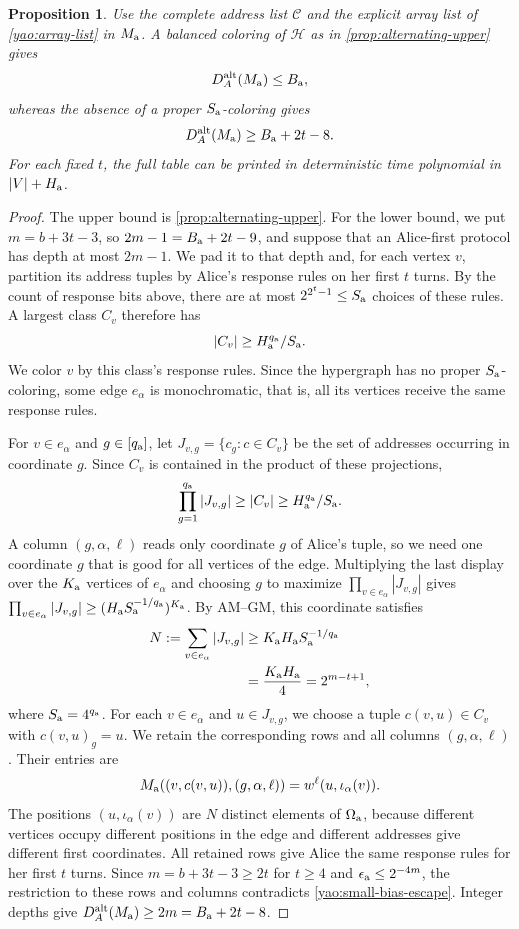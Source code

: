 \documentclass[11pt,letterpaper]{article} \usepackage[utf8]{inputenc}
\theoremstyle{plain} \newtheorem{theorem}{Theorem}[section]
\newtheorem{proposition}[proposition]{Proposition}
\theoremstyle{definition} \newaliascnt{definition}{theorem}
\begin{document}
\begin{proposition}\label{yao:lift}
Use the complete address list $\mathcal C$ and the explicit array list of
\cref{yao:array-list} in $M_{\rm a}$. A balanced coloring of $\mathcal H$ as in
\cref{prop:alternating-upper} gives
\[
D_A^{\rm alt}(M_{\rm a})\le B_{\rm a},
\]
whereas the absence of a proper $S_{\rm a}$-coloring gives
\[
D_A^{\rm alt}(M_{\rm a})\ge B_{\rm a}+2t-8.
\]
For each fixed $t$, the full table can be printed in deterministic time
polynomial in $|V|+H_{\rm a}$.
\end{proposition}
\begin{proof}
The upper bound is \cref{prop:alternating-upper}. For the lower bound, we put
$m=b+3t-3$, so $2m-1=B_{\rm a}+2t-9$, and suppose that an Alice-first protocol
has depth at most $2m-1$. We pad it to that depth and, for each vertex $v$,
partition its address tuples by Alice's response rules on her first $t$ turns.
By the count of response bits above, there are at most
$2^{2^t-1}\le S_{\rm a}$ choices of these rules. A largest class $C_v$ therefore has
\[
|C_v|\ge H_{\rm a}^{q_{\rm a}}/S_{\rm a}.
\]
We color $v$ by this class's response rules. Since the hypergraph has no proper
$S_{\rm a}$-coloring, some edge $e_\alpha$ is monochromatic, that is, all its
vertices receive the same response rules.

For $v\in e_\alpha$ and $g\in[q_{\rm a}]$, let
$J_{v,g}=\{c_g:c\in C_v\}$ be the set of addresses occurring in coordinate
$g$. Since $C_v$ is contained in the product of these projections,
\[
\prod_{g=1}^{q_{\rm a}}|J_{v,g}|\ge |C_v|
\ge H_{\rm a}^{q_{\rm a}}/S_{\rm a}.
\]
A column $(g,\alpha,\ell)$ reads only coordinate $g$ of Alice's tuple, so we
need one coordinate $g$ that is good for all vertices of the edge. Multiplying
the last display over the $K_{\rm a}$ vertices of $e_\alpha$ and choosing $g$ to
maximize $\prod_{v\in e_\alpha}|J_{v,g}|$ gives
$\prod_{v\in e_\alpha}|J_{v,g}|\ge(H_{\rm a}S_{\rm a}^{-1/q_{\rm a}})^{K_{\rm a}}$.
By AM--GM, this coordinate satisfies
\[
\begin{aligned}
N:=\sum_{v\in e_\alpha}|J_{v,g}|
&\ge K_{\rm a}H_{\rm a}S_{\rm a}^{-1/q_{\rm a}}\\
&=\frac{K_{\rm a}H_{\rm a}}4=2^{m-t+1},
\end{aligned}
\]
where $S_{\rm a}=4^{q_{\rm a}}$.
For each $v\in e_\alpha$ and $u\in J_{v,g}$, we choose a tuple $c(v,u)\in C_v$
with $c(v,u)_g=u$. We retain the corresponding rows and all columns
$(g,\alpha,\ell)$. Their entries are
\[
M_{\rm a}((v,c(v,u)),(g,\alpha,\ell))
=w^\ell(u,\iota_\alpha(v)).
\]
The positions $(u,\iota_\alpha(v))$ are $N$ distinct elements of $\Omega_{\rm a}$, because different vertices occupy different
positions in the edge and different addresses give different first coordinates.
All retained rows give Alice the same response rules for her first $t$ turns. Since $m=b+3t-3\ge2t$ for $t\ge4$
and $\epsilon_{\rm a}\le2^{-4m}$, the restriction to these rows and columns contradicts
\cref{yao:small-bias-escape}. Integer depths give
$D_A^{\rm alt}(M_{\rm a})\ge2m=B_{\rm a}+2t-8$.


\end{proof}
\end{document}
